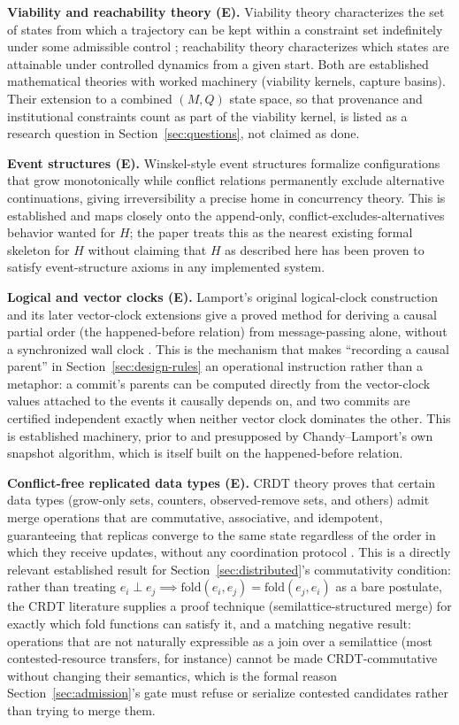 \documentclass[11pt]{article}
\begin{document}
\textbf{Viability and reachability theory (E).} Viability theory characterizes the set of states from which a trajectory can be kept within a constraint set indefinitely under some admissible control \cite{aubin1991}; reachability theory characterizes which states are attainable under controlled dynamics from a given start. Both are established mathematical theories with worked machinery (viability kernels, capture basins). Their extension to a combined $(M,Q)$ state space, so that provenance and institutional constraints count as part of the viability kernel, is listed as a research question in Section~\ref{sec:questions}, not claimed as done.

\textbf{Event structures (E).} Winskel-style event structures formalize configurations that grow monotonically while conflict relations permanently exclude alternative continuations, giving irreversibility a precise home in concurrency theory. This is established and maps closely onto the append-only, conflict-excludes-alternatives behavior wanted for $H$; the paper treats this as the nearest existing formal skeleton for $H$ without claiming that $H$ as described here has been proven to satisfy event-structure axioms in any implemented system.

\textbf{Logical and vector clocks (E).} Lamport's original logical-clock construction and its later vector-clock extensions give a proved method for deriving a causal partial order (the happened-before relation) from message-passing alone, without a synchronized wall clock \cite{lamport1978}. This is the mechanism that makes ``recording a causal parent'' in Section~\ref{sec:design-rules} an operational instruction rather than a metaphor: a commit's parents can be computed directly from the vector-clock values attached to the events it causally depends on, and two commits are certified independent exactly when neither vector clock dominates the other. This is established machinery, prior to and presupposed by Chandy--Lamport's own snapshot algorithm, which is itself built on the happened-before relation.

\textbf{Conflict-free replicated data types (E).} CRDT theory proves that certain data types (grow-only sets, counters, observed-remove sets, and others) admit merge operations that are commutative, associative, and idempotent, guaranteeing that replicas converge to the same state regardless of the order in which they receive updates, without any coordination protocol \cite{shapiro2011}. This is a directly relevant established result for Section~\ref{sec:distributed}'s commutativity condition: rather than treating $e_i \perp e_j \implies \mathrm{fold}(e_i, e_j) = \mathrm{fold}(e_j, e_i)$ as a bare postulate, the CRDT literature supplies a proof technique (semilattice-structured merge) for exactly which fold functions can satisfy it, and a matching negative result: operations that are not naturally expressible as a join over a semilattice (most contested-resource transfers, for instance) cannot be made CRDT-commutative without changing their semantics, which is the formal reason Section~\ref{sec:admission}'s gate must refuse or serialize contested candidates rather than trying to merge them.
\end{document}
